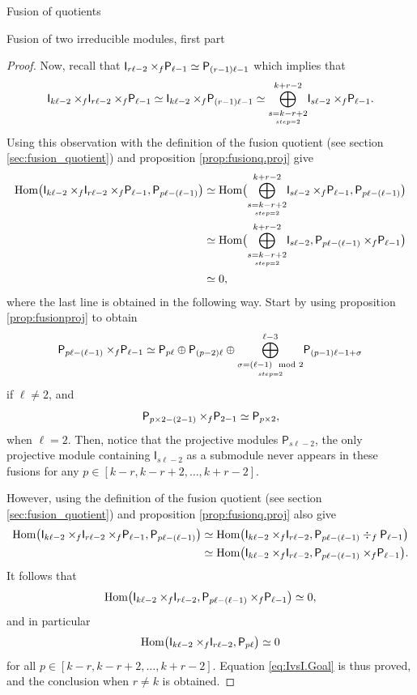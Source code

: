 \documentclass[reqno]{amsart}
\newcommand{\dl}[1]{\mathsf I_{#1}}
\newcommand{\dP}[1]{\mathsf P_{#1}}
\newcommand{\xf}{\times\hspace{-0.27em}_f}
\newcommand{\lc}{\ell}
\newcommand{\Hom}[1]{\text{\rm{Hom}}\big( #1 \big)}
\begin{document}
\begin{section}{Fusion of quotients}
\begin{subsection}{Fusion of two irreducible modules, first part}
\begin{proof}
   Now, recall that $\dl{r \lc -2} \xf \dP{\lc-1} \simeq \dP{(r-1)\lc -1}$ which implies that
\begin{equation}\label{eq:fusionII}
\dl{k \lc -2} \xf \dl{r\lc -2} \xf \dP{\lc-1} \simeq \dl{k\lc-2} \xf \dP{(r-1)\lc -1} \simeq\overset{k+r-2}{\underset{\underset{step=2}{s=k-r+2}}{\bigoplus}}\dl{s\lc -2} \xf \dP{\lc -1}.
\end{equation}
Using this observation with the definition of the fusion quotient (see section \ref{sec:fusion_quotient}) and proposition \ref{prop:fusionq.proj} give
\begin{align}
	\Hom{\dl{k \lc -2} \xf \dl{r\lc -2} \xf \dP{\lc-1},\dP{p\lc-(\lc-1)}} & \simeq \Hom{\overset{k +r -2}{\underset{\underset{step=2}{s=k-r+2}}{\bigoplus}}\dl{s \lc -2} \xf \dP{\lc -1},\dP{p\lc - (\lc -1)}} \notag\\
	& \simeq \Hom{\overset{k +r -2}{\underset{\underset{step=2}{s=k-r+2}}{\bigoplus}}\dl{s \lc -2} ,\dP{p\lc - (\lc-1)}\xf \dP{\lc -1}}\notag\\
	& \simeq 0,\label{eq:fusionIvsI.1}
\end{align}
where the last line is obtained in the following way. Start by using proposition \ref{prop:fusionproj} to obtain
\begin{equation}
\dP{p\lc - (\lc-1)}\xf \dP{\lc -1} \simeq \dP{p\lc} \oplus \dP{(p-2)\lc} %
\oplus \overset{\lc-3}{\underset{\underset{step=2}{\sigma = (\lc -1) \mod 2}}{\bigoplus}} \dP{(p-1)\lc -1 + \sigma}
\end{equation}
if $\lc \neq 2$, and
\begin{equation}
\dP{p \times 2 - (2-1)}\xf \dP{2 -1} \simeq \dP{p\times 2},
\end{equation}
when $\lc =2$. Then, notice that the projective modules $\dP{s \lc-2}$, the only projective module containing $\dl{s\lc-2}$ as a submodule never appears in these fusions for any $p \in [k-r, k-r+2, \hdots, k+r-2 ] $.

However, using the definition of the fusion quotient (see section \ref{sec:fusion_quotient}) and proposition \ref{prop:fusionq.proj} also give
\begin{align}
	\Hom{\dl{k \lc -2} \xf \dl{r\lc -2} \xf \dP{\lc-1},\dP{p\lc-(\lc-1)}} & \simeq \Hom{\dl{k \lc -2} \xf \dl{r\lc -2}, \dP{p\lc - (\lc-1)} \div_{f} \dP{\lc-1}} \notag\\
	& \simeq \Hom{\dl{k \lc -2} \xf \dl{r\lc -2}, \dP{p\lc - (\lc-1)} \xf \dP{\lc-1}}. \label{eq:fusionIvsI.2}
\end{align}
It follows that $$\Hom{\dl{k \lc -2} \xf \dl{r\lc -2}, \dP{p\lc - (\lc-1)} \xf \dP{\lc-1}} \simeq 0,$$ and in particular $$\Hom{\dl{k \lc -2} \xf \dl{r\lc -2}, \dP{p\lc}}\simeq 0$$ for all $p \in [k-r, k-r+2, \hdots, k+r-2 ] $. Equation \eqref{eq:IvsI.Goal} is thus proved, and the conclusion when $r \neq k$ is obtained.


\end{proof}
\end{subsection}
\end{section}
\end{document}
